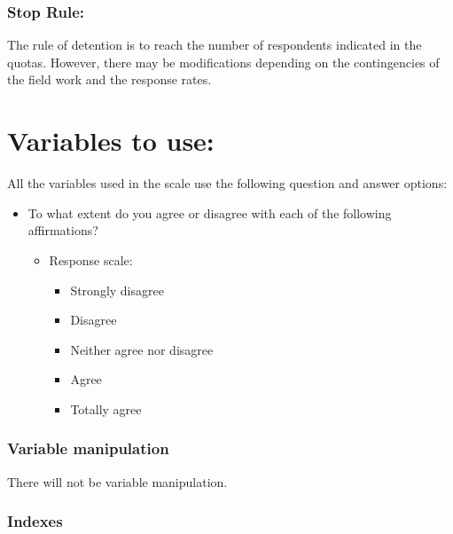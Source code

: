 \documentclass[
]{article}
\providecommand{\tightlist}{%
  \setlength{\itemsep}{0pt}\setlength{\parskip}{0pt}}
\begin{document}
\hypertarget{stop-rule}{%
\subsubsection{Stop Rule:}\label{stop-rule}}

The rule of detention is to reach the number of respondents indicated in
the quotas. However, there may be modifications depending on the
contingencies of the field work and the response rates.

\hypertarget{variables-to-use}{%
\section{Variables to use:}\label{variables-to-use}}

All the variables used in the scale use the following question and
answer options:

\begin{itemize}
\tightlist
\item
  To what extent do you agree or disagree with each of the following
  affirmations?

  \begin{itemize}
  \tightlist
  \item
    Response scale:

    \begin{itemize}
    \tightlist
    \item
      Strongly disagree
    \item
      Disagree
    \item
      Neither agree nor disagree
    \item
      Agree
    \item
      Totally agree
    \end{itemize}
  \end{itemize}
\end{itemize}

\hypertarget{variable-manipulation}{%
\subsubsection{Variable manipulation}\label{variable-manipulation}}

There will not be variable manipulation.

\hypertarget{indexes}{%
\subsubsection{Indexes}\label{indexes}}
\end{document}
